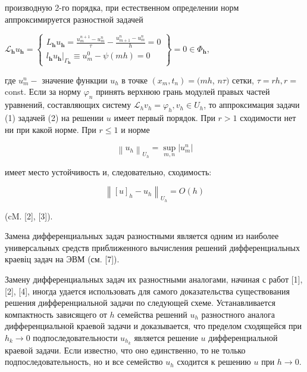 \documentclass[10pt]{article}
\begin{document}
производную 2-го порядка, при естественном определении норм аппроксимируется разностной задачей



$\mathscr{L}_{\boldsymbol{h}} u_{\boldsymbol{h}}=\left\{\begin{array}{l}L_{\boldsymbol{h}} u_{\boldsymbol{h}}=\frac{u_{m}^{n+1}-u_{m}^{n}}{\tau}-\frac{u_{m+1}^{n}-u_{m}^{n}}{h}=0 \\ \left.l_{\boldsymbol{h}} u_{\boldsymbol{h}}\right|_{\Gamma_{\boldsymbol{h}}} \equiv u_{m}^{0}-\psi(m h)=0\end{array}\right\}=0 \in \Phi_{\boldsymbol{h}}$,



где $u_{m}^{n}-$ значение функции $u_{h}$ в точке $\left(x_{m}, t_{n}\right)=(m h$, $n \tau)$ сетки, $\tau=r h, r=$ const. Если за норму $\varphi_{n}$ принять верхнюю грань модулей правых частей уравнений, составляющих систему $\mathscr{L}_{h} v_{h}=\varphi_{h}, v_{h} \in U_{h}$, то аппроксимация задачи (1) задачей (2) на решении $u$ имеет первый порядок. При $r>1$ сходимости нет ни при какой норме. При $r \leqslant 1$ и норме



\[

\left\|u_{h}\right\|_{U_{h}}=\sup _{m, n}\left|u_{m}^{n}\right|

\]



имеет место устойчивость и, следовательно, сходимость:



\[

\left\|[u]_{h}-u_{h}\right\|_{U_{h}}=O(h)

\]



(cM. [2], [3]).



Замена дифференциальных задач разностными является одним из наиболее универсальных средств приближенного вычисления решений дифференциальных краевіц задач на ЭВМ (см. [7]).



Замену дифференциальных задач их разностными аналогами, начиная с работ [1], [2], [4], иногда удается использовать для самого доказательства существования решения дифференциальной задачи по следующей схеме. Устанавливается компактность зависящего от $h$ семейства решений $u_{h}$ разностного аналога дифференциальной краевой задачи и доказывается, что пределом сходящейся при $h_{k} \rightarrow 0$ подпоследовательности $u_{h_{k}}$ является решение $u$ дифференциальной краевой задачи. Если известно, что оно единственно, то не только подпоследовательность, но и все семейство $u_{h}$ сходится к решению $u$ при $h \rightarrow 0$.
\end{document}
